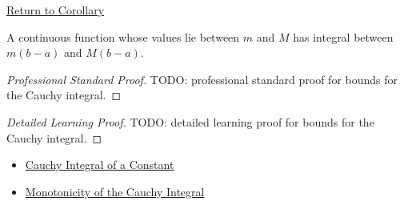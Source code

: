\newpage
{}
\label{prf:cauchy-integral-bounds}

\begin{remark*}[Return]
\hyperref[cor:cauchy-integral-bounds]{Return to Corollary}
\end{remark*}

\begin{corollary*}
A continuous function whose values lie between \(m\) and \(M\) has integral
between \(m(b-a)\) and \(M(b-a)\).
\end{corollary*}

\begin{proof}[Professional Standard Proof]
\LRAProofBodyStart
TODO: professional standard proof for bounds for the Cauchy integral.
\end{proof}

\begin{proof}[Detailed Learning Proof]
\LRAProofBodyStart
TODO: detailed learning proof for bounds for the Cauchy integral.
\end{proof}

\begin{remark*}
\end{remark*}

\begin{dependencies}
\begin{itemize}
  \item \hyperref[prop:cauchy-integral-constant]{Cauchy Integral of a Constant}
  \item \hyperref[thm:cauchy-integral-monotonicity]{Monotonicity of the Cauchy Integral}
\end{itemize}
\end{dependencies}

\clearpage
